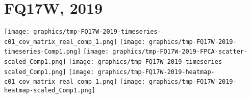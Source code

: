 
\section{FQ17W, 2019}
\setcounter{theorem}{0}

\renewcommand{\theenumi}{\roman{enumi}}
\renewcommand{\labelenumi}{\textnormal{(\theenumi)}$\;\;$}


\begin{center}
\begin{minipage}{7.0in}
\texttt{[image: graphics/tmp-FQ17W-2019-timeseries-c01\_cov\_matrix\_real\_comp\_1.png]}
\quad
\texttt{[image: graphics/tmp-FQ17W-2019-timeseries-Comp1.png]}
\vskip 0.5cm
\texttt{[image: graphics/tmp-FQ17W-2019-FPCA-scatter-scaled\_Comp1.png]}
\quad
\texttt{[image: graphics/tmp-FQ17W-2019-timeseries-scaled\_Comp1.png]}
\vskip 0.5cm
\texttt{[image: graphics/tmp-FQ17W-2019-heatmap-c01\_cov\_matrix\_real\_comp\_1.png]}
\quad
\texttt{[image: graphics/tmp-FQ17W-2019-heatmap-scaled\_Comp1.png]}
\end{minipage}
\end{center}


\renewcommand{\theenumi}{\roman{enumi}}
\renewcommand{\labelenumi}{\textnormal{(\theenumi)}$\;\;$}

